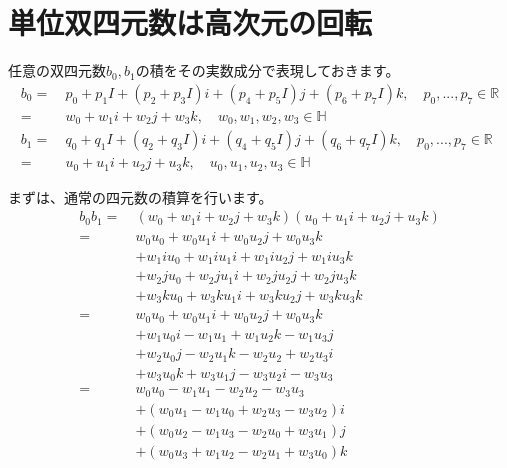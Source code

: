 \documentclass[a4paper,12pt]{jsreport}
\begin{document}
\section{単位双四元数は高次元の回転}

任意の双四元数$b_0,b_1$の積をその実数成分で表現しておきます。
\begin{equation}
\begin{split}
b_0=~&p_0+p_1I+(p_2+p_3I)i+(p_4+p_5I)j+(p_6+p_7I)k,\quad p_0,...,p_7\in\mathbb{R}\\
=~&w_0+w_1i+w_2j+w_3k,\quad w_0,w_1,w_2,w_3\in\mathbb{H}\\
b_1=~&q_0+q_1I+(q_2+q_3I)i+(q_4+q_5I)j+(q_6+q_7I)k,\quad p_0,...,p_7\in\mathbb{R}\\
=~&u_0+u_1i+u_2j+u_3k,\quad u_0,u_1,u_2,u_3\in\mathbb{H}
\end{split}
\end{equation}

まずは、通常の四元数の積算を行います。
\begin{equation}
\begin{split}
b_0b_1=~&(w_0+w_1i+w_2j+w_3k)(u_0+u_1i+u_2j+u_3k)\\
=~&w_0u_0+w_0u_1i+w_0u_2j+w_0u_3k\\
&+w_1iu_0+w_1iu_1i+w_1iu_2j+w_1iu_3k\\
&+w_2ju_0+w_2ju_1i+w_2ju_2j+w_2ju_3k\\
&+w_3ku_0+w_3ku_1i+w_3ku_2j+w_3ku_3k\\
=~&w_0u_0+w_0u_1i+w_0u_2j+w_0u_3k\\
&+w_1u_0i-w_1u_1+w_1u_2k-w_1u_3j\\
&+w_2u_0j-w_2u_1k-w_2u_2+w_2u_3i\\
&+w_3u_0k+w_3u_1j-w_3u_2i-w_3u_3\\
=~&w_0u_0-w_1u_1-w_2u_2-w_3u_3\\
&+(w_0u_1-w_1u_0+w_2u_3-w_3u_2)i\\
&+(w_0u_2-w_1u_3-w_2u_0+w_3u_1)j\\
&+(w_0u_3+w_1u_2-w_2u_1+w_3u_0)k
\end{split}
\end{equation}
\end{document}
